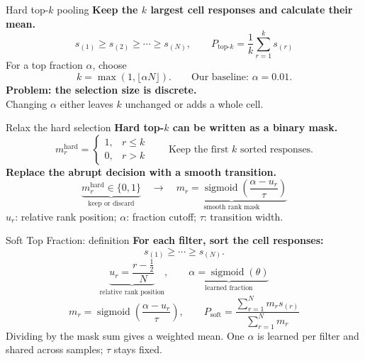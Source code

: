 \begin{frame}{Hard top-$k$ pooling}
\textbf{Keep the $k$ largest cell responses and calculate their mean.}
\[s_{(1)}\ge s_{(2)}\ge\cdots\ge s_{(N)},\qquad
\boxed{P_{\mathrm{top}\text{-}k}=\frac1k\sum_{r=1}^{k}s_{(r)}}\]
\vspace{3mm}
For a top fraction $\alpha$, choose
\[k=\max(1,\lfloor\alpha N\rfloor).
\qquad\text{Our baseline: }\alpha=0.01.\]
\vspace{3mm}
\textbf{Problem: the selection size is discrete.}\\
Changing $\alpha$ either leaves $k$ unchanged or adds a whole cell.
\end{frame}


\begin{frame}{Relax the hard selection}
\textbf{Hard top-$k$ can be written as a binary mask.}
\[m_r^{\mathrm{hard}}=\begin{cases}1,&r\le k\\0,&r>k\end{cases}
\qquad\text{Keep the first $k$ sorted responses.}\]
\vspace{3mm}
\textbf{Replace the abrupt decision with a smooth transition.}
\[\underbrace{m_r^{\mathrm{hard}}\in\{0,1\}}_{\text{keep or discard}}
\quad\longrightarrow\quad
\underbrace{m_r=\operatorname{sigmoid}\!\left(\frac{\alpha-u_r}{\tau}\right)}_{\text{smooth rank mask}}\]
\small $u_r$: relative rank position; $\alpha$: fraction cutoff; $\tau$: transition width.
\end{frame}

\begin{frame}{Soft Top Fraction: definition}
\textbf{For each filter, sort the cell responses:}
\[s_{(1)}\ge\cdots\ge s_{(N)}.\]
\[\underbrace{u_r=\frac{r-\tfrac12}{N}}_{\text{relative rank position}},\qquad
\underbrace{\alpha=\operatorname{sigmoid}(\theta)}_{\text{learned fraction}}\]
\[m_r=\operatorname{sigmoid}\!\left(\frac{\alpha-u_r}{\tau}\right),\qquad
\boxed{P_{\mathrm{soft}}=\frac{\sum_{r=1}^{N}m_rs_{(r)}}{\sum_{r=1}^{N}m_r}}\]
\small Dividing by the mask sum gives a weighted mean. One $\alpha$ is learned per filter and shared across samples; $\tau$ stays fixed.
\end{frame}


